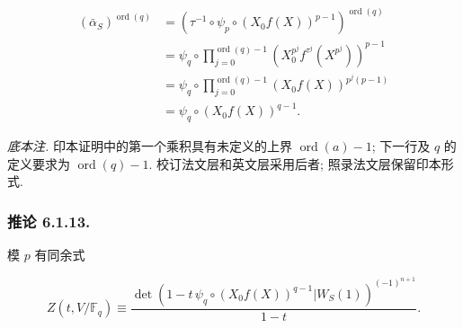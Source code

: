 \begin{equation*}
\begin{aligned}
(\bar\alpha_S)^{\operatorname{ord}(q)}
&=
\left(
\tau^{-1}\circ\psi_p\circ(X_0f(X))^{p-1}
\right)^{\operatorname{ord}(q)}\\
&=
\psi_q\circ
\prod_{j=0}^{\operatorname{ord}(q)-1}
\left(X_0^{p^j}f^{\tau^j}(X^{p^j})\right)^{p-1}\\
&=
\psi_q\circ
\prod_{j=0}^{\operatorname{ord}(q)-1}
(X_0f(X))^{p^j(p-1)}\\
&=\psi_q\circ(X_0f(X))^{q-1}.
\end{aligned}
\end{equation*}

\medskip
\noindent\emph{底本注.}
印本证明中的第一个乘积具有未定义的上界 $\operatorname{ord}(a)-1$;
下一行及 $q$ 的定义要求为 $\operatorname{ord}(q)-1$.
校订法文层和英文层采用后者; 照录法文层保留印本形式.

\subsubsection*{推论 6.1.13.}
模 $p$ 有同余式

\begin{equation*}
Z(t,V/\mathbb F_q)
\equiv
\frac{
\det\!\left(
1-t\,\psi_q\circ(X_0f(X))^{q-1}
\mathrel{\Big|}W_S(1)
\right)^{(-1)^{n+1}}
}{1-t}.
\end{equation*}


